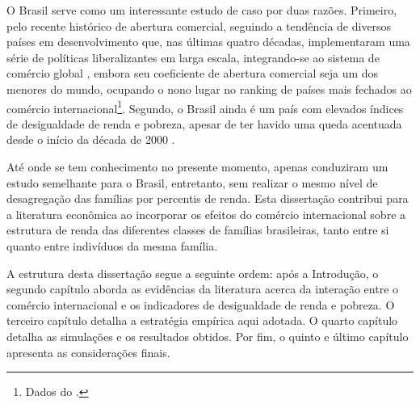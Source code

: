 O Brasil serve como um interessante estudo de caso por duas razões. Primeiro, pelo recente histórico de abertura comercial, seguindo a tendência de diversos países em desenvolvimento que, nas últimas quatro décadas, implementaram uma série de políticas liberalizantes em larga escala, integrando-se ao sistema de comércio global \cite{pavcnik17}, embora seu coeficiente de abertura comercial seja um dos menores do mundo, ocupando o nono lugar no ranking de países mais fechados ao comércio internacional\footnote{Dados do \textcite{ourworldindata}.}. Segundo, o Brasil ainda é um país com elevados índices de desigualdade de renda e pobreza, apesar de ter havido uma queda acentuada desde o início da década de 2000 \cite{ocde15}.

Até onde se tem conhecimento no presente momento, apenas \textcite{carneiro06, ferreira06} conduziram um estudo semelhante para o Brasil, entretanto, sem realizar o mesmo nível de desagregação das famílias por percentis de renda. Esta dissertação contribui para a literatura econômica ao incorporar os efeitos do comércio internacional sobre a estrutura de renda das diferentes classes de famílias brasileiras, tanto entre si quanto entre indivíduos da mesma família.

A estrutura desta dissertação segue a seguinte ordem: após a Introdução, o segundo capítulo aborda as evidências da literatura acerca da interação entre o comércio internacional e os indicadores de desigualdade de renda e pobreza. O terceiro capítulo detalha a estratégia empírica aqui adotada. O quarto capítulo detalha as simulações e os resultados obtidos. Por fim, o quinto e último capítulo apresenta as considerações finais.


